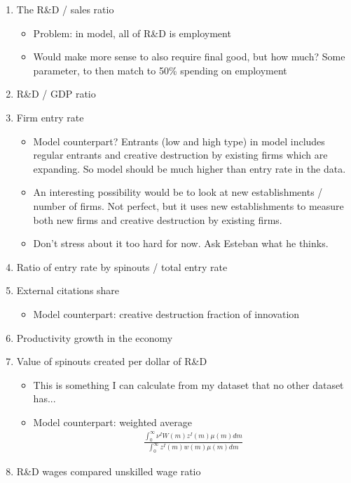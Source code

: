 \documentclass[12pt,english]{article}
\theoremstyle{remark}
\begin{document}
\begin{enumerate}
	\item The R\&D / sales ratio
	\begin{itemize}
		\item Problem: in model, all of R\&D is employment
		\item Would make more sense to also require final good, but how much? Some parameter, to then match to 50\% spending on employment
	\end{itemize}
	\item R\&D / GDP ratio
	\item Firm entry rate
	\begin{itemize}
		\item Model counterpart? Entrants (low and high type) in model includes regular entrants and creative destruction by existing firms which are expanding. So model should be much higher than entry rate in the data.
		\item An interesting possibility would be to look at new establishments / number of firms. Not perfect, but it uses new establishments to measure both new firms and creative destruction by existing firms. 
		\item Don't stress about it too hard for now. Ask Esteban what he thinks.
	\end{itemize}
	\item Ratio of entry rate by spinouts / total entry rate
	\item External citations share
	\begin{itemize}
		\item Model counterpart: creative destruction fraction of innovation
	\end{itemize}
	\item Productivity growth in the economy
	\item Value of spinouts created per dollar of R\&D
	\begin{itemize}
		\item This is something I can calculate from my dataset that no other dataset has...
		\item Model counterpart: weighted average
		\begin{align*}
			\frac{\int_0^{\infty} \nu^I W(m) z^I(m) \mu(m) dm}{\int_0^{\infty} z^I(m) w(m) \mu(m) dm}
		\end{align*}
	\end{itemize}
	\item R\&D wages compared unskilled wage ratio
	\begin{itemize}

\end{itemize}
\end{enumerate}
\end{document}
